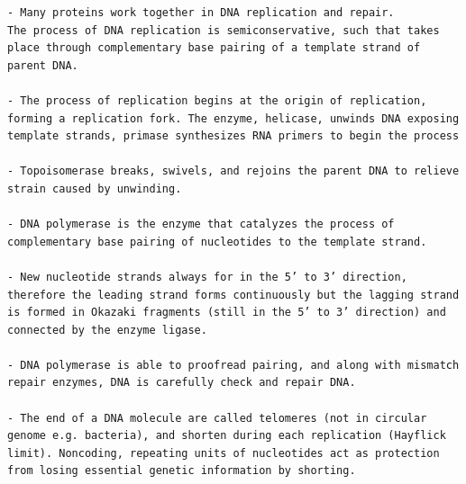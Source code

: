 \documentclass[letterpaper]{article}
\begin{document}
\begin{verbatim}
- Many proteins work together in DNA replication and repair. 
The process of DNA replication is semiconservative, such that takes place through complementary base pairing of a template strand of parent DNA. 

- The process of replication begins at the origin of replication, forming a replication fork. The enzyme, helicase, unwinds DNA exposing template strands, primase synthesizes RNA primers to begin the process

- Topoisomerase breaks, swivels, and rejoins the parent DNA to relieve strain caused by unwinding. 

- DNA polymerase is the enzyme that catalyzes the process of complementary base pairing of nucleotides to the template strand. 

- New nucleotide strands always for in the 5’ to 3’ direction, therefore the leading strand forms continuously but the lagging strand is formed in Okazaki fragments (still in the 5’ to 3’ direction) and connected by the enzyme ligase. 

- DNA polymerase is able to proofread pairing, and along with mismatch repair enzymes, DNA is carefully check and repair DNA. 

- The end of a DNA molecule are called telomeres (not in circular genome e.g. bacteria), and shorten during each replication (Hayflick limit). Noncoding, repeating units of nucleotides act as protection from losing essential genetic information by shorting. 
\end{verbatim}
\end{document}
